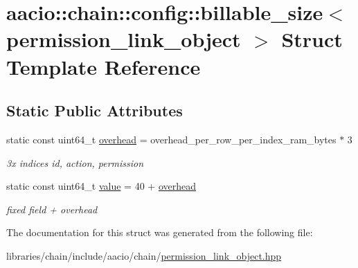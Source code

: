 \hypertarget{structaacio_1_1chain_1_1config_1_1billable__size_3_01permission__link__object_01_4}{}\section{aacio\+:\+:chain\+:\+:config\+:\+:billable\+\_\+size$<$ permission\+\_\+link\+\_\+object $>$ Struct Template Reference}
\label{structaacio_1_1chain_1_1config_1_1billable__size_3_01permission__link__object_01_4}
\subsection*{Static Public Attributes}
\begin{DoxyCompactItemize}
\item 
\mbox{\label{structaacio_1_1chain_1_1config_1_1billable__size_3_01permission__link__object_01_4_a8199a61771be8e8bdb6319a97b64c6ae}} 
static const uint64\+\_\+t \mbox{\hyperlink{structaacio_1_1chain_1_1config_1_1billable__size_3_01permission__link__object_01_4_a8199a61771be8e8bdb6319a97b64c6ae}{overhead}} = overhead\+\_\+per\+\_\+row\+\_\+per\+\_\+index\+\_\+ram\+\_\+bytes $\ast$ 3
\begin{DoxyCompactList}\small\item\em 3x indices id, action, permission \end{DoxyCompactList}\item 
\mbox{\label{structaacio_1_1chain_1_1config_1_1billable__size_3_01permission__link__object_01_4_a8be04e714c8c4932fa09b624311721ca}} 
static const uint64\+\_\+t \mbox{\hyperlink{structaacio_1_1chain_1_1config_1_1billable__size_3_01permission__link__object_01_4_a8be04e714c8c4932fa09b624311721ca}{value}} = 40 + \mbox{\hyperlink{structaacio_1_1chain_1_1config_1_1billable__size_3_01permission__link__object_01_4_a8199a61771be8e8bdb6319a97b64c6ae}{overhead}}
\begin{DoxyCompactList}\small\item\em fixed field + overhead \end{DoxyCompactList}\end{DoxyCompactItemize}


The documentation for this struct was generated from the following file\+:\begin{DoxyCompactItemize}
\item 
libraries/chain/include/aacio/chain/\mbox{\hyperlink{permission__link__object_8hpp}{permission\+\_\+link\+\_\+object.\+hpp}}\end{DoxyCompactItemize}
